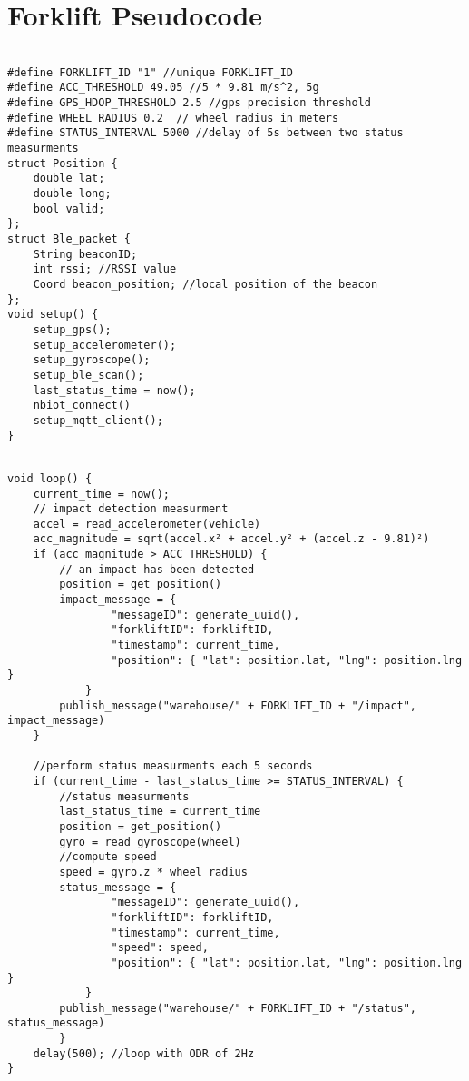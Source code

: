 \section{Forklift Pseudocode}
\begin{verbatim}

#define FORKLIFT_ID "1" //unique FORKLIFT_ID 
#define ACC_THRESHOLD 49.05 //5 * 9.81 m/s^2, 5g
#define GPS_HDOP_THRESHOLD 2.5 //gps precision threshold 
#define WHEEL_RADIUS 0.2  // wheel radius in meters
#define STATUS_INTERVAL 5000 //delay of 5s between two status measurments
struct Position {
    double lat;
    double long;
    bool valid;
};
struct Ble_packet {
    String beaconID;
    int rssi; //RSSI value
    Coord beacon_position; //local position of the beacon
};
void setup() {
    setup_gps();
    setup_accelerometer();
    setup_gyroscope();
    setup_ble_scan();
    last_status_time = now();
    nbiot_connect()
    setup_mqtt_client();
}

\end{verbatim}
\pagebreak
\begin{verbatim}

void loop() {
    current_time = now();
    // impact detection measurment
    accel = read_accelerometer(vehicle)
    acc_magnitude = sqrt(accel.x² + accel.y² + (accel.z - 9.81)²)
    if (acc_magnitude > ACC_THRESHOLD) {
        // an impact has been detected
        position = get_position()
        impact_message = {
                "messageID": generate_uuid(),
                "forkliftID": forkliftID,
                "timestamp": current_time,
                "position": { "lat": position.lat, "lng": position.lng }
            }
        publish_message("warehouse/" + FORKLIFT_ID + "/impact", impact_message)
    }

    //perform status measurments each 5 seconds
    if (current_time - last_status_time >= STATUS_INTERVAL) { 
        //status measurments
        last_status_time = current_time
        position = get_position()
        gyro = read_gyroscope(wheel)
        //compute speed
        speed = gyro.z * wheel_radius
        status_message = {
                "messageID": generate_uuid(),
                "forkliftID": forkliftID,
                "timestamp": current_time,
                "speed": speed,
                "position": { "lat": position.lat, "lng": position.lng }
            }
        publish_message("warehouse/" + FORKLIFT_ID + "/status", status_message)
        }
    delay(500); //loop with ODR of 2Hz
}
\end{verbatim}


